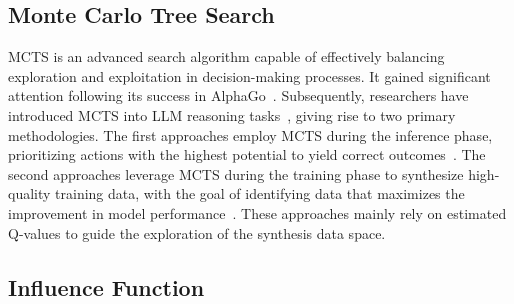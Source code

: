 \subsection{Monte Carlo Tree Search}
\label{subsection:MCTS}
MCTS is an advanced search algorithm capable of effectively balancing exploration and exploitation in decision-making processes. It gained significant attention following its success in AlphaGo~\cite{DBLP:journals/nature/SilverHMGSDSAPL16}. Subsequently, researchers have introduced MCTS into LLM reasoning tasks~\cite{DBLP:conf/emnlp/HaoGMHWWH23}, giving rise to two primary methodologies. The first approaches employ MCTS during the inference phase, prioritizing actions with the highest potential to yield correct outcomes~\cite{DBLP:journals/corr/abs-2408-03314, wu2024inferencescalinglawsempirical}. The second approaches leverage MCTS during the training phase to synthesize high-quality training data, with the goal of identifying data that maximizes the improvement in model performance~\cite{DBLP:journals/corr/abs-2408-06195, DBLP:journals/corr/abs-2405-00451, DBLP:journals/corr/abs-2406-07394, DBLP:journals/corr/abs-2406-03816}. 
These approaches mainly rely on estimated Q-values to guide the exploration of the synthesis data space. 

\subsection{Influence Function}
\label{subsection:Influence function}


